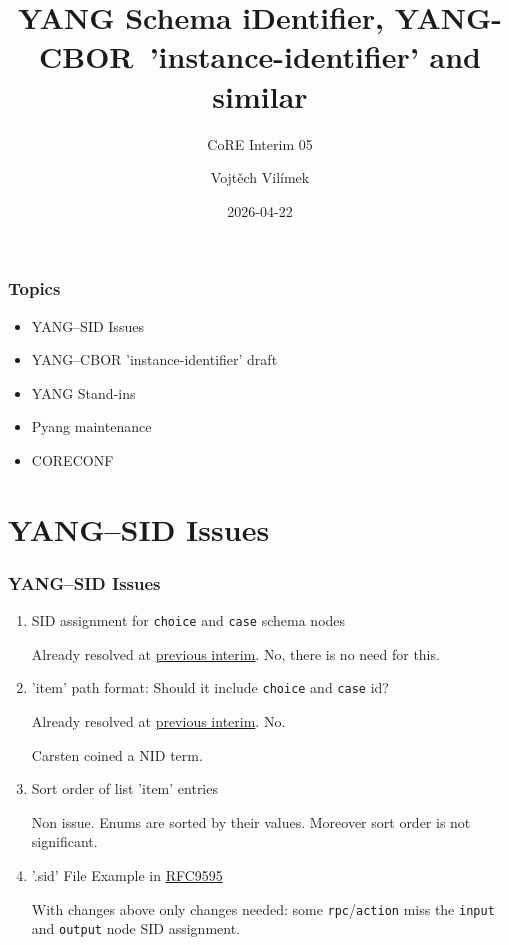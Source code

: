 \documentclass{beamer}
\title{YANG Schema iDentifier, YANG-CBOR~'instance-identifier' and similar}
\subtitle{CoRE Interim 05}
\author{Vojtěch Vilímek}
\date{2026-04-22}
\begin{document}
\begin{frame}
	\titlepage
\end{frame}

\begin{frame}
 	\frametitle{Topics}

	\begin{itemize}
		\item YANG--SID Issues
		\item YANG--CBOR 'instance-identifier' draft
		\item YANG Stand-ins
		\item Pyang maintenance
		\item CORECONF
	\end{itemize}
	
\end{frame}

\section{YANG--SID Issues}
\begin{frame}[fragile]
	\frametitle{YANG--SID Issues}
	
	\begin{enumerate}
		\item SID assignment for \verb|choice| and \verb|case| schema nodes
		
		Already resolved at \href{https://youtu.be/C8RaX4XCRvE}{previous interim}. No, there is no need for this.		
		\item 'item' path format: Should it include \verb|choice| and \verb|case| id?
		
		Already resolved at \href{https://youtu.be/C8RaX4XCRvE}{previous interim}. No.
		
		Carsten coined a NID term.
		\item Sort order of list 'item' entries
		
		Non issue. Enums are sorted by their values.
		Moreover sort order is not significant.
	        \item '.sid' File Example in \href{https://datatracker.ietf.org/doc/rfc9595/}{RFC9595}
		
		With changes above only changes needed: some \verb|rpc|/\verb|action|
		miss the \verb|input| and \verb|output| node SID assignment.
	
	\end{enumerate}
\end{frame}
\end{document}
